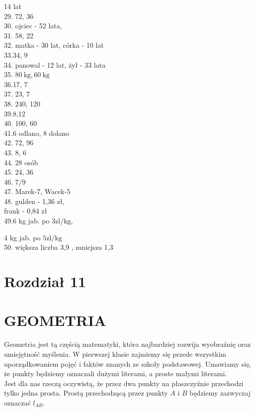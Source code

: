 \documentclass[10pt]{article}
\begin{document}
14 lat\\
29. 72, 36\\
30. ojciec - 52 lata,\\
31. 58, 22\\
32. matka - 30 lat, córka - 10 lat\\
33.34, 9\\
34. panowal - 12 lat, żył - 33 lata\\
35. \(80 \mathrm{~kg}, 60 \mathrm{~kg}\)\\
36.17, 7\\
37. 23, 7\\
38. 240, 120\\
39.8,12\\
40. 100, 60\\
41.6 odlano, 8 dolano\\
42. 72, 96\\
43. 8, 6\\
44. 28 osób\\
45. 24, 36\\
46. 7/9\\
47. Marek-7, Wacek-5\\
48. gulden - 1,36 zł,\\
frank - 0,84 zł\\
49.6 kg jab. po \(3 \mathrm{zl} / \mathrm{kg}\),

4 kg jab. po \(5 \mathrm{zl} / \mathrm{kg}\)\\
50. większa liczba 3,9 , mniejsza 1,3

\section*{Rozdział 11}
\section*{GEOMETRIA}
Geometria jest tą częścią matematyki, która najbardziej rozwija wyobraźnię oraz umiejętność myślenia. W pierwszej klasie zajmiemy się przede wszystkim uporządkowaniem pojęć i faktów znanych ze szkoły podstawowej. Umawiamy się, że punkty będziemy oznaczali dużymi literami, a proste małymi literami.\\
Jest dla nas rzeczą oczywistą, że przez dwa punkty na płaszczyźnie przechodzi tylko jedna prosta. Prostą przechodzącą przez punkty \(A\) i \(B\) będziemy zazwyczaj oznaczać \(l_{A B}\).
\end{document}
